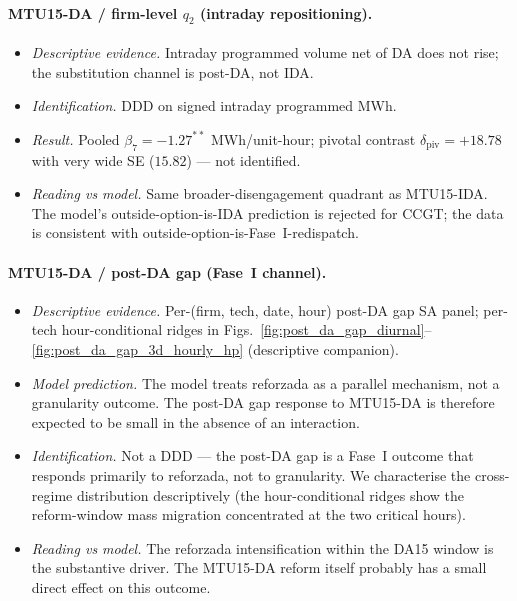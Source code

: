 \documentclass[11pt,a4paper]{article}
\begin{document}
\paragraph{MTU15-DA / firm-level $q_2$ (intraday repositioning).}
\begin{itemize}
\item \emph{Descriptive evidence.} Intraday programmed volume net of DA does not rise; the substitution channel is post-DA, not IDA.
\item \emph{Identification.} DDD on signed intraday programmed MWh.
\item \emph{Result.} Pooled $\beta_7 = -1.27^{**}$ MWh/unit-hour; pivotal contrast $\delta_{\text{piv}} = +18.78$ with very wide SE ($15.82$) --- not identified.
\item \emph{Reading vs model.} Same broader-disengagement quadrant as MTU15-IDA. The model's outside-option-is-IDA prediction is rejected for CCGT; the data is consistent with outside-option-is-Fase~I-redispatch.
\end{itemize}

\paragraph{MTU15-DA / post-DA gap (Fase~I channel).}
\begin{itemize}
\item \emph{Descriptive evidence.} Per-(firm, tech, date, hour) post-DA gap SA panel; per-tech hour-conditional ridges in Figs.~\ref{fig:post_da_gap_diurnal}--\ref{fig:post_da_gap_3d_hourly_hp} (descriptive companion).
\item \emph{Model prediction.} The model treats reforzada as a parallel mechanism, not a granularity outcome. The post-DA gap response to MTU15-DA is therefore expected to be small in the absence of an interaction.
\item \emph{Identification.} Not a DDD --- the post-DA gap is a Fase~I outcome that responds primarily to reforzada, not to granularity. We characterise the cross-regime distribution descriptively (the hour-conditional ridges show the reform-window mass migration concentrated at the two critical hours).
\item \emph{Reading vs model.} The reforzada intensification within the DA15 window is the substantive driver. The MTU15-DA reform itself probably has a small direct effect on this outcome.
\end{itemize}

\end{document}

